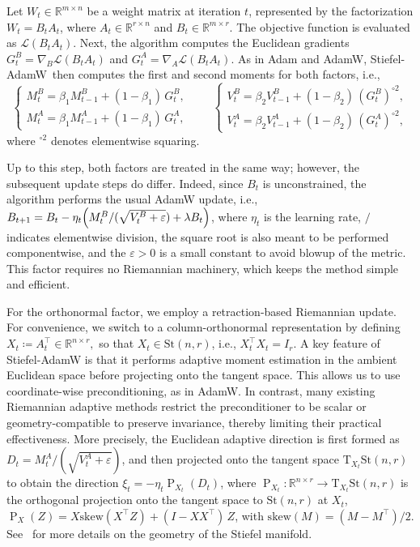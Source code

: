 \documentclass[11pt,a4paper]{article}
\numberwithin{equation}{section}
\newcommand{\algname}{Stiefel-AdamW}
\newcommand{\tr}{^{\top}} %
\newcommand{\Stnr}{\mathrm{St}(n,r)}    %
\newcommand{\T}{\mathrm{T}}
\newcommand{\R}{\mathbb{R}}
\newcommand{\cL}{{\mathcal L}}
\theoremstyle{plain}
\theoremstyle{definition}
\theoremstyle{remark}
\DeclareMathOperator{\Proj}{P}
\begin{document}
Let $ W_{t} \in \R^{m \times n} $ be a weight matrix at iteration $ t $, represented by the factorization $ W_{t} = B_{t} A_{t} $, where $ A_{t} \in \R^{r \times n} $ and $ B_{t} \in \R^{m \times r} $. The objective function is evaluated as $ \cL(B_{t}A_{t}) $. Next, the algorithm computes the Euclidean gradients $ G_{t}^B = \nabla_{B} \cL(B_{t}A_{t}) $ and $ G_{t}^A = \nabla_{A} \cL(B_{t}A_{t}) $. As in Adam and AdamW, \algname{}~then computes the first and second moments for both factors, i.e.,
\[
   \begin{cases}
        M^{B}_{t} = \beta_{1} M^{B}_{t-1} + (1-\beta_{1}) \, G_{t}^{B}, \\
        M^{A}_{t} = \beta_{1} M^{A}_{t-1} + (1-\beta_{1}) \, G_{t}^{A},
   \end{cases} \qquad 
   \begin{cases}
        V^{B}_{t} = \beta_{2} V^{B}_{t-1} + (1-\beta_{2}) \, (G_{t}^{B})^{\circ 2}, \\
        V^{A}_{t} = \beta_{2} V^{A}_{t-1} + (1-\beta_{2}) \, (G_{t}^{A})^{\circ 2},
   \end{cases}
\]
where $ ^{\circ 2} $ denotes elementwise squaring.

Up to this step, both factors are treated in the same way; however, the subsequent update steps do differ. Indeed, since $ B_{t} $ is unconstrained, the algorithm performs the usual AdamW update, i.e., $B_{t+1} = B_{t} - \eta_{t} \Bigl( M^{B}_{t} / ( \sqrt{V^{B}_{t} + \varepsilon} ) + \lambda B_{t} \Bigr)$, where $ \eta_{t} $ is the learning rate, $ / $ indicates elementwise division, the square root is also meant to be performed componentwise, and the $ \varepsilon >0$ is a small constant to avoid blowup of the metric. This factor requires no Riemannian machinery, which keeps the method simple and efficient.

For the orthonormal factor, we employ a retraction-based Riemannian update. For convenience, we switch to a column-orthonormal representation by defining $X_{t} \coloneqq A_{t}\tr \in \R^{n \times r},$ so that $X_{t} \in \Stnr$, i.e., $X_{t}\tr\! X_{t} = I_{r}$.
A key feature of \algname{} is that it performs adaptive moment estimation in the ambient Euclidean space before projecting onto the tangent space. This allows us to use coordinate-wise preconditioning, as in AdamW. In contrast, many existing Riemannian adaptive methods restrict the preconditioner to be scalar or geometry-compatible to preserve invariance, thereby limiting their practical effectiveness.
More precisely, the Euclidean adaptive direction is first formed as $D_{t} = M^{A}_{t} /(\sqrt{V^{A}_{t} + \varepsilon})$, and then projected onto the tangent space $ \T_{X_{t}}\Stnr $ to obtain the direction $\xi_{t} = -\eta_{t} \Proj_{X_{t}}(D_{t})$, where $\Proj_{X_{t}} \colon \R^{n \times r} \to \T_{X_{t}}\Stnr$ is the orthogonal projection onto the tangent space to $\Stnr$ at $X_{t}$, $\Proj_{X}(Z) = X \mathrm{skew}(X\tr \! Z) + (I-XX\tr) \, Z $, with $\mathrm{skew}(M)=(M-M\tr)/2$. See~ for more details on the geometry of the Stiefel manifold. 
\end{document}
